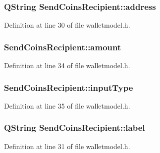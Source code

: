 \subsubsection[{address}]{\setlength{\rightskip}{0pt plus 5cm}Q\+String Send\+Coins\+Recipient\+::address}\label{class_send_coins_recipient_aaa8a3b13ff9f8e84baced2aec75307a0}


Definition at line 30 of file walletmodel.\+h.

\hypertarget{class_send_coins_recipient_a54ab1355617a342b9b3d7f6e0781f578}{}
\subsubsection[{amount}]{ Send\+Coins\+Recipient\+::amount}\label{class_send_coins_recipient_a54ab1355617a342b9b3d7f6e0781f578}


Definition at line 34 of file walletmodel.\+h.

\hypertarget{class_send_coins_recipient_a92cb8e99cd0a80c5f972955338a8a0f5}{}
\subsubsection[{input\+Type}]{ Send\+Coins\+Recipient\+::input\+Type}\label{class_send_coins_recipient_a92cb8e99cd0a80c5f972955338a8a0f5}


Definition at line 35 of file walletmodel.\+h.

\hypertarget{class_send_coins_recipient_a0152933f2c0cb9164d2fcb36bca83666}{}
\subsubsection[{label}]{\setlength{\rightskip}{0pt plus 5cm}Q\+String Send\+Coins\+Recipient\+::label}\label{class_send_coins_recipient_a0152933f2c0cb9164d2fcb36bca83666}


Definition at line 31 of file walletmodel.\+h.

\hypertarget{class_send_coins_recipient_a3b07492ab64678b45cc5b44cea1090ca}{}
